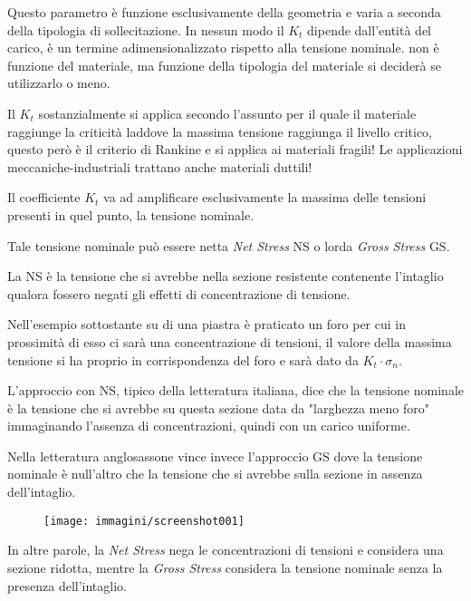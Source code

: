 \documentclass{article}
\begin{document}
\begin{adjustwidth}{2in}{}
		Questo parametro è funzione esclusivamente della geometria e varia a seconda della tipologia di sollecitazione. In nessun modo il $K_t$ dipende dall'entità del carico, è un termine adimensionalizzato rispetto alla tensione nominale. non è funzione del materiale, ma funzione della tipologia del materiale si deciderà se utilizzarlo o meno. \newline 
		
		Il $K_t$ sostanzialmente si applica secondo l'assunto per il quale il materiale raggiunge la criticità laddove la massima tensione raggiunga il livello critico, questo però è il criterio di Rankine e si applica ai materiali fragili! Le applicazioni meccaniche-industriali trattano anche materiali duttili! \newline 
		
		Il coefficiente $K_t$ va ad amplificare esclusivamente la massima delle tensioni presenti in quel punto, la tensione nominale. \newline 
		
		Tale tensione nominale può essere netta \textit{Net Stress} NS o lorda \textit{Gross Stress} GS. \newline 
		
		La NS è la tensione che si avrebbe nella sezione resistente contenente l'intaglio qualora fossero negati gli effetti di concentrazione di tensione. 
		
		Nell'esempio sottostante su di una piastra è praticato un foro per cui in prossimità di esso ci sarà una concentrazione di tensioni, il valore della massima tensione si ha proprio in corrispondenza del foro e sarà dato da $K_t\cdot\sigma_n$. 
		
		L'approccio con NS, tipico della letteratura italiana, dice che la tensione nominale è la tensione che si avrebbe su questa sezione data da "larghezza meno foro" immaginando l'assenza di concentrazioni, quindi con un carico uniforme. 
		
		Nella letteratura anglosassone vince invece l'approccio GS dove la tensione nominale è null'altro che la tensione che si avrebbe sulla sezione in assenza dell'intaglio. 
		
		\begin{figure}[H]
			\centering
			\texttt{[image: immagini/screenshot001]}
			\label{fig:screenshot001}
		\end{figure}
		
		
		In altre parole, la \textit{Net Stress} nega le concentrazioni di tensioni e considera una sezione ridotta, mentre la \textit{Gross Stress} considera la tensione nominale senza la presenza dell'intaglio.\newline 
		

\end{adjustwidth}
\end{document}
